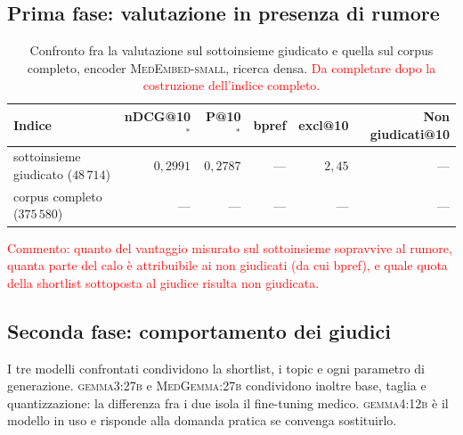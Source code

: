 \documentclass[pdflatex,sn-mathphys-num]{sn-jnl}
\theoremstyle{thmstyleone}
\theoremstyle{thmstyletwo}
\theoremstyle{thmstylethree}
\newcommand{\ev}[1]{\textcolor{red}{#1}}
\begin{document}
\subsection{Prima fase: valutazione in presenza di rumore}\label{sec:res-corpus}

\begin{table}[H]
\centering
\begin{tabular}{lrrrrr}
\toprule
Indice & nDCG@10$^{*}$ & P@10$^{*}$ & bpref & excl@10 & Non giudicati@10 \\
\midrule
sottoinsieme giudicato ($48\,714$) & $0{,}2991$ & $0{,}2787$ & --- & $2{,}45$ & --- \\
corpus completo ($375\,580$)       & --- & --- & --- & --- & --- \\
\bottomrule
\end{tabular}
\caption{Confronto fra la valutazione sul sottoinsieme giudicato e quella sul corpus completo, encoder \textsc{MedEmbed-small}, ricerca densa. \ev{Da completare dopo la costruzione dell'indice completo.}}
\label{tab:corpus}
\end{table}

\ev{Commento: quanto del vantaggio misurato sul sottoinsieme sopravvive al rumore, quanta parte del calo è attribuibile ai non giudicati (da cui bpref), e quale quota della shortlist sottoposta al giudice risulta non giudicata.}

\subsection{Seconda fase: comportamento dei giudici}\label{sec:res-comportamento}

I tre modelli confrontati condividono la shortlist, i topic e ogni parametro di generazione. \textsc{gemma3:27b} e \textsc{MedGemma:27b} condividono inoltre base, taglia e quantizzazione: la differenza fra i due isola il fine-tuning medico. \textsc{gemma4:12b} è il modello in uso e risponde alla domanda pratica se convenga sostituirlo.
\end{document}
